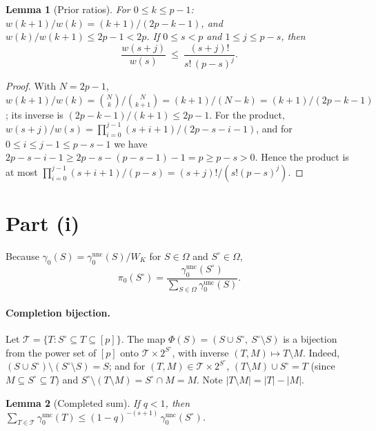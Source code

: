 \documentclass[11pt]{article}
\newtheorem{lemma}{Lemma}
\theoremstyle{remark}
\newcommand{\unc}{\mathrm{unc}}
\newcommand{\gu}{\gamma_0^{\unc}}
\begin{document}
\begin{lemma}[Prior ratios]\label{lem:prior}
For $0\le k\le p-1$: $w(k+1)/w(k)=(k+1)/(2p-k-1)$, and $w(k)/w(k+1)\le 2p-1<2p$. If $0\le s<p$ and $1\le j\le p-s$, then
\[
\frac{w(s+j)}{w(s)}\ \le\ \frac{(s+j)!}{s!\,(p-s)^j}.
\]
\end{lemma}

\begin{proof}
With $N=2p-1$, $w(k+1)/w(k)=\binom{N}{k}/\binom{N}{k+1}=(k+1)/(N-k)=(k+1)/(2p-k-1)$; its inverse is $(2p-k-1)/(k+1)\le 2p-1$. For the product, $w(s+j)/w(s)=\prod_{i=0}^{j-1}(s+i+1)/(2p-s-i-1)$, and for $0\le i\le j-1\le p-s-1$ we have $2p-s-i-1\ge 2p-s-(p-s-1)-1=p\ge p-s>0$. Hence the product is at most $\prod_{i=0}^{j-1}(s+i+1)/(p-s)=(s+j)!/(s!(p-s)^j)$.
\end{proof}

\section{Part (i)}

Because $\gamma_0(S)=\gu(S)/W_K$ for $S\in\Omega$ and $S^\circ\in\Omega$,
\begin{equation}\label{eq:pi0ratio}
\pi_0(S^\circ)=\frac{\gu(S^\circ)}{\sum_{S\in\Omega}\gu(S)} .
\end{equation}

\paragraph{Completion bijection.} Let $\mathcal T=\{T: S^\circ\subseteq T\subseteq[p]\}$. The map $\Phi(S)=(S\cup S^\circ,\ S^\circ\setminus S)$ is a bijection from the power set of $[p]$ onto $\mathcal T\times 2^{S^\circ}$, with inverse $(T,M)\mapsto T\setminus M$. Indeed, $(S\cup S^\circ)\setminus(S^\circ\setminus S)=S$; and for $(T,M)\in\mathcal T\times2^{S^\circ}$, $(T\setminus M)\cup S^\circ=T$ (since $M\subseteq S^\circ\subseteq T$) and $S^\circ\setminus(T\setminus M)=S^\circ\cap M=M$. Note $|T\setminus M|=|T|-|M|$.

\begin{lemma}[Completed sum]\label{lem:completed}
If $q<1$, then $\sum_{T\in\mathcal T}\gu(T)\le (1-q)^{-(s+1)}\,\gu(S^\circ)$.
\end{lemma}
\end{document}
